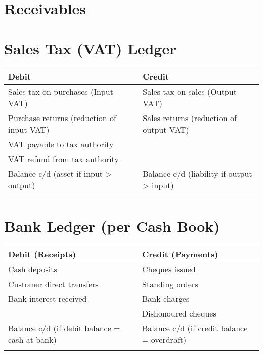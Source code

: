 \section{Receivables}

\section*{Sales Tax (VAT) Ledger}

\begin{tabular}{@{}p{5cm}p{5cm}p{5cm}@{}}
\toprule
\textbf{Debit} & \textbf{} & \textbf{Credit} \\
\midrule
Sales tax on purchases (Input VAT) & & Sales tax on sales (Output VAT) \\
Purchase returns (reduction of input VAT) & & Sales returns (reduction of output VAT) \\
VAT payable to tax authority & & \\
VAT refund from tax authority & & \\
Balance c/d (asset if input > output) & & Balance c/d (liability if output > input) \\
\midrule
 & & \\
\bottomrule
\end{tabular}

\vspace{1cm}

\section*{Bank Ledger (per Cash Book)}

\begin{tabular}{@{}p{5cm}p{5cm}p{5cm}@{}}
\toprule
\textbf{Debit (Receipts)} & \textbf{} & \textbf{Credit (Payments)} \\
\midrule
Cash deposits & & Cheques issued \\
Customer direct transfers & & Standing orders \\
Bank interest received & & Bank charges \\
 & & Dishonoured cheques \\
Balance c/d (if debit balance = cash at bank) & & Balance c/d (if credit balance = overdraft) \\
\midrule
 & & \\
\bottomrule
\end{tabular}

